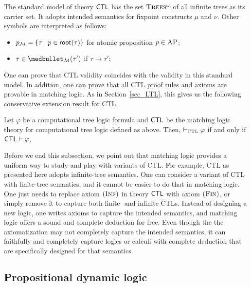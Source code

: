 \documentclass{amsart}
\begin{document}
The standard model of theory $\mathsf{CTL}$ has the set $\textsc{Trees$^\omega$}$ of all infinite trees
as its carrier set.
It adopts intended semantics for fixpoint constructs $\mu$ and $\nu$.
Other symbols are interpreted as follows:
\begin{itemize}
\item $p_{\mathcal{M}} = \{ \tau \mid p \in \mathsf{root}(\tau) \}$ for atomic proposition $p \in \textsc{AP}$;
\item $\tau \in \snext_\MM(\tau')$ if $\tau \to \tau'$;
\end{itemize}
One can prove that CTL validity coincides with the validity in this standard model.
In addition, one can prove that all CTL proof rules and axioms are provable
in matching logic.
As in Section~\ref{sec_LTL},
this gives us the following conservative extension result for CTL.
\begin{theorem}
Let $\varphi$ be a computational tree logic formula
and $\mathsf{CTL}$ be the matching logic theory for computational tree logic defined as above.
Then,
$\vdash_{\textsc{CTL}} \varphi$ if and only if
$\mathsf{CTL} \vdash \varphi$.
\end{theorem}

Before we end this subsection, we point out that matching logic
provides a uniform way to study and play with variants of CTL.
For example, CTL as presented here adopts infinite-tree semantics.
One can consider a variant of CTL with finite-tree semantics, and it cannot be easier
to do that in matching logic.
One just needs to replace axiom $\textsc{(Inf)}$ in theory $\mathsf{CTL}$ with axiom $\textsc{(Fin)}$,
or simply remove it to capture both finite- and infinite CTLs.
Instead of designing a new logic, one writes axioms to capture
the intended semantics, and matching logic offers a sound and complete deduction for free.
Even though the the axiomatization may not completely capture the intended semantics,
it can faithfully and completely capture logics or calculi with complete deduction
that are specifically designed for that semantics.


\subsection{Propositional dynamic logic}
\end{document}
